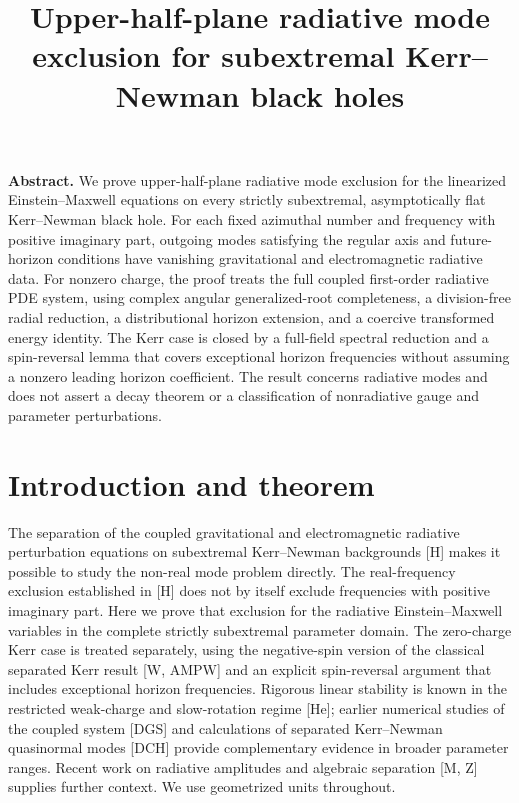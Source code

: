 \documentclass[
  10pt,
  a4paper,
]{article}
\title{Upper-half-plane radiative mode exclusion for subextremal
Kerr--Newman black holes}
\author{}
\date{}
\begin{document}
\maketitle

\textbf{Abstract.} We prove upper-half-plane radiative mode exclusion
for the linearized Einstein--Maxwell equations on every strictly
subextremal, asymptotically flat Kerr--Newman black hole. For each fixed
azimuthal number and frequency with positive imaginary part, outgoing
modes satisfying the regular axis and future-horizon conditions have
vanishing gravitational and electromagnetic radiative data. For nonzero
charge, the proof treats the full coupled first-order radiative PDE
system, using complex angular generalized-root completeness, a
division-free radial reduction, a distributional horizon extension, and
a coercive transformed energy identity. The Kerr case is closed by a
full-field spectral reduction and a spin-reversal lemma that covers
exceptional horizon frequencies without assuming a nonzero leading
horizon coefficient. The result concerns radiative modes and does not
assert a decay theorem or a classification of nonradiative gauge and
parameter perturbations.

\section{Introduction and theorem}\label{introduction-and-theorem}

The separation of the coupled gravitational and electromagnetic
radiative perturbation equations on subextremal Kerr--Newman backgrounds
{[}H{]} makes it possible to study the non-real mode problem directly.
The real-frequency exclusion established in {[}H{]} does not by itself
exclude frequencies with positive imaginary part. Here we prove that
exclusion for the radiative Einstein--Maxwell variables in the complete
strictly subextremal parameter domain. The zero-charge Kerr case is
treated separately, using the negative-spin version of the classical
separated Kerr result {[}W, AMPW{]} and an explicit spin-reversal
argument that includes exceptional horizon frequencies. Rigorous linear
stability is known in the restricted weak-charge and slow-rotation
regime {[}He{]}; earlier numerical studies of the coupled system
{[}DGS{]} and calculations of separated Kerr--Newman quasinormal modes
{[}DCH{]} provide complementary evidence in broader parameter ranges.
Recent work on radiative amplitudes and algebraic separation {[}M, Z{]}
supplies further context. We use geometrized units throughout.
\end{document}
